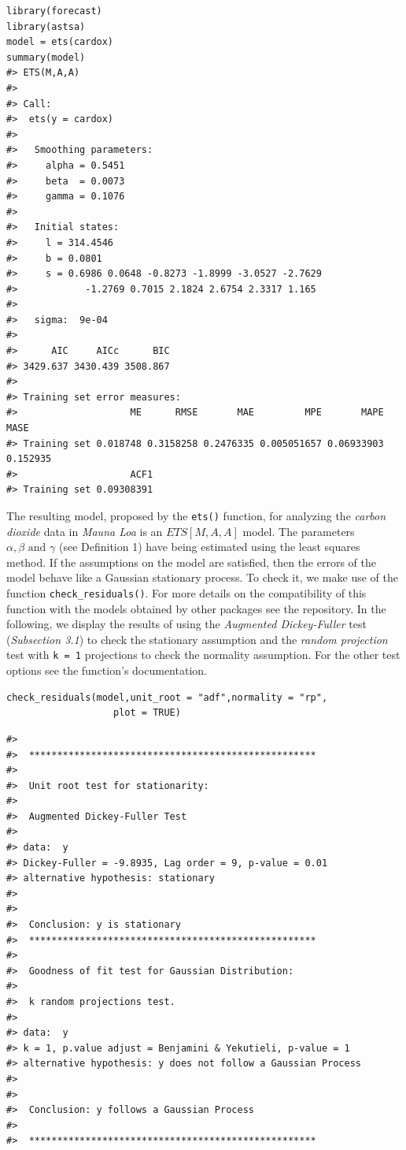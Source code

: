 \begin{verbatim}
library(forecast)
library(astsa)
model = ets(cardox)
summary(model)
#> ETS(M,A,A) 
#> 
#> Call:
#>  ets(y = cardox) 
#> 
#>   Smoothing parameters:
#>     alpha = 0.5451 
#>     beta  = 0.0073 
#>     gamma = 0.1076 
#> 
#>   Initial states:
#>     l = 314.4546 
#>     b = 0.0801 
#>     s = 0.6986 0.0648 -0.8273 -1.8999 -3.0527 -2.7629
#>            -1.2769 0.7015 2.1824 2.6754 2.3317 1.165
#> 
#>   sigma:  9e-04
#> 
#>      AIC     AICc      BIC 
#> 3429.637 3430.439 3508.867 
#> 
#> Training set error measures:
#>                    ME      RMSE       MAE         MPE       MAPE     MASE
#> Training set 0.018748 0.3158258 0.2476335 0.005051657 0.06933903 0.152935
#>                    ACF1
#> Training set 0.09308391
\end{verbatim}

The resulting model, proposed by the \texttt{ets()} function, for analyzing the \emph{carbon dioxide} data in \emph{Mauna Loa} is an \(ETS[M,A,A]\) model. The parameters \(\alpha, \beta \text{ and } \gamma\) (see Definition 1) have being estimated using the least squares method. If the assumptions on the model are satisfied, then the errors of the model behave like a Gaussian stationary process. To check it, we make use of the function \texttt{check\_residuals()}. For more details on the compatibility of this function with the models obtained by other packages see the  repository. In the following, we display the results of using the \emph{Augmented Dickey-Fuller} test (\emph{Subsection 3.1}) to check the stationary assumption and the \emph{random projection} test with \texttt{k\ =\ 1} projections to check the normality assumption. For the other test options see the function's documentation.

\begin{verbatim}
check_residuals(model,unit_root = "adf",normality = "rp",
                   plot = TRUE)
\end{verbatim}

\begin{verbatim}
#> 
#>  *************************************************** 
#> 
#>  Unit root test for stationarity: 
#> 
#>  Augmented Dickey-Fuller Test
#> 
#> data:  y
#> Dickey-Fuller = -9.8935, Lag order = 9, p-value = 0.01
#> alternative hypothesis: stationary
#> 
#> 
#>  Conclusion: y is stationary
#>  *************************************************** 
#> 
#>  Goodness of fit test for Gaussian Distribution: 
#> 
#>  k random projections test.
#> 
#> data:  y
#> k = 1, p.value adjust = Benjamini & Yekutieli, p-value = 1
#> alternative hypothesis: y does not follow a Gaussian Process
#> 
#> 
#>  Conclusion: y follows a Gaussian Process
#>  
#>  ***************************************************
\end{verbatim}

